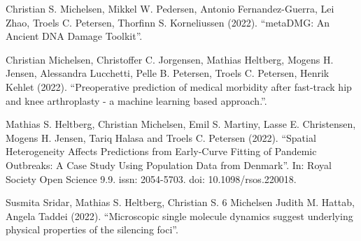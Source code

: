 \begin{description} [labelindent=1cm,style=multiline,leftmargin=3cm]
    \item [Paper 1:] Christian S. Michelsen, Mikkel W. Pedersen, Antonio Fernandez-Guerra, Lei Zhao, Troels C. Petersen, Thorfinn S. Korneliussen (2022). ``metaDMG: An Ancient DNA Damage Toolkit''. \\
    \item [Paper 2:] Christian Michelsen, Christoffer C. Jorgensen, Mathias Heltberg, Mogens H. Jensen, Alessandra Lucchetti, Pelle B. Petersen, Troels C. Petersen, Henrik Kehlet (2022). ``Preoperative prediction of medical morbidity after fast-track hip and knee arthroplasty - a machine learning based approach.''. \\
    \item [Paper 3:] Mathias S. Heltberg, Christian Michelsen, Emil S. Martiny, Lasse E. Christensen, Mogens H. Jensen, Tariq Halasa and Troels C. Petersen (2022). ``Spatial Heterogeneity Affects Predictions from Early-Curve Fitting of Pandemic Outbreaks: A Case Study Using Population Data from Denmark''. In: Royal Society Open Science 9.9. issn: 2054-5703. doi: 10.1098/rsos.220018.
    \item [Paper 4:] Susmita Sridar, Mathias S. Heltberg, Christian S. 6 Michelsen Judith M. Hattab, Angela Taddei (2022). ``Microscopic single molecule dynamics suggest underlying physical properties of the silencing foci''.
\end{description}


